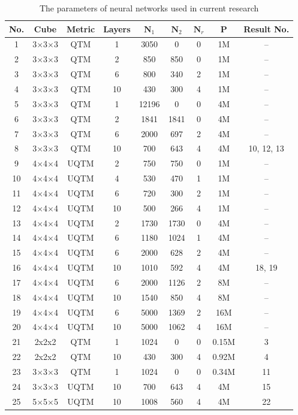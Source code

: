 
\begin{table*}
\caption{The parameters of neural networks used in current research}\label{tbl_neural_net}
\begin{tabular*}{\textwidth}{@{\extracolsep\fill}ccccccccc}
\toprule
\textbf{No.} & \textbf{Cube} & \textbf{Metric}  & \textbf{Layers} & $\boldsymbol{N}_1$ & $\boldsymbol{N}_2$ & $\boldsymbol{N}_r$ & $\boldsymbol{P}$ & \textbf{Result No.} \\
\midrule
1 & 3$\times$3$\times$3 & QTM & 1 & 3050 & 0 & 0 & 1M & -- \\
2 & 3$\times$3$\times$3 & QTM & 2 & 850 & 850 & 0 & 1M & --\\
3 & 3$\times$3$\times$3 & QTM & 6 & 800 & 340 & 2 & 1M & --\\
4 & 3$\times$3$\times$3 & QTM & 10 & 430 & 300 & 4 & 1M & --\\
\midrule
5 & 3$\times$3$\times$3 & QTM & 1 & 12196 & 0 & 0 & 4M & --\\
6 & 3$\times$3$\times$3 & QTM & 2 & 1841  & 1841 & 0 & 4M & --\\
7 & 3$\times$3$\times$3 & QTM & 6 & 2000 & 697 & 2 & 4M & --\\
8 & 3$\times$3$\times$3 & QTM & 10 & 700 & 643 & 4 & 4M & 10, 12, 13\\
\midrule
9 & 4$\times$4$\times$4 & UQTM & 2 & 750 & 750 & 0 & 1M & --\\
10 & 4$\times$4$\times$4 & UQTM & 4 & 530 & 470 & 1 & 1M & --\\
11 & 4$\times$4$\times$4 & UQTM & 6 & 720 & 300 & 2 & 1M & --\\
12 & 4$\times$4$\times$4 & UQTM & 10 & 500 & 266 & 4 & 1M & --\\
\midrule
13 & 4$\times$4$\times$4 & UQTM & 2 & 1730  & 1730 & 0 & 4M & --\\
14 & 4$\times$4$\times$4 & UQTM & 6 & 1180 & 1024 & 1 & 4M & --\\
15 & 4$\times$4$\times$4 & UQTM & 6 & 2000 & 628 & 2 & 4M & --\\
16 & 4$\times$4$\times$4 & UQTM & 10 & 1010 & 592 & 4 & 4M & 18, 19\\
\midrule
17 & 4$\times$4$\times$4 & UQTM & 6 & 2000 & 1126 & 2 & 8M & --\\
18 & 4$\times$4$\times$4 & UQTM & 10 & 1540 & 850 & 4 & 8M & --\\
\midrule
19 & 4$\times$4$\times$4 & UQTM & 6 & 5000 & 1369 & 2 & 16M & --\\
20 & 4$\times$4$\times$4 & UQTM & 10 & 5000 & 1062 & 4 & 16M & --\\
\midrule
21 & 2x2x2 & QTM & 1 & 1024 & 0 & 0 & 0.15M & 3\\
22 & 2x2x2 & QTM & 10 & 430 & 300 & 4 & 0.92M & 4\\
23 & 3$\times$3$\times$3 & QTM & 1 & 1024 & 0 & 0 & 0.34M & 11\\
24 & 3$\times$3$\times$3 & UQTM & 10 & 700 & 643 & 4 & 4M & 15\\
25 & 5$\times$5$\times$5 & UQTM & 10 & 1008 & 560 & 4 & 4M & 22\\
\bottomrule
\end{tabular*}

\end{table*}